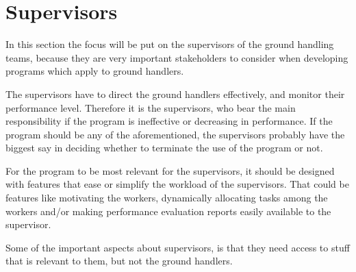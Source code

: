 \section{Supervisors}
In this section the focus will be put on the supervisors of the ground handling teams, because they are very important stakeholders to consider when developing programs which apply to ground handlers.

The supervisors have to direct the ground handlers effectively, and monitor their performance level. Therefore it is the supervisors, who bear the main responsibility if the program is ineffective or decreasing in performance. If the program should be any of the aforementioned, the supervisors probably have the biggest say in deciding whether to terminate the use of the program or not.

For the program to be most relevant for the supervisors, it should be designed with features that ease or simplify the workload of the supervisors. That could be features like motivating the workers, dynamically allocating tasks among the workers and/or making performance evaluation reports easily available to the supervisor.

Some of the important aspects about supervisors, is that they need access to stuff that is relevant to them, but not the ground handlers.